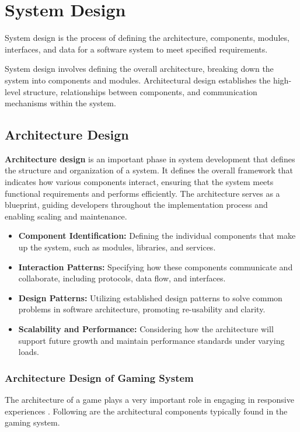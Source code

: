 \chapter{System Design}

System design is the process of defining the \cite {hocking2022unity} architecture, components, modules, interfaces, and data for a software system to meet specified requirements.

System design involves defining the overall architecture, breaking down the system into components and modules. Architectural design establishes the high-level structure, relationships between components, and communication mechanisms within the system.

\section{Architecture Design}
\textbf{Architecture design} is an important phase in system development that defines the structure and organization of a system. It defines the overall framework that indicates how various components interact, ensuring that the system meets functional requirements and performs efficiently. The architecture serves as a blueprint, guiding developers throughout the implementation process and enabling scaling and maintenance.

\begin{itemize}
\item \textbf{Component Identification:} Defining the individual components that make up the system, such as modules, libraries, and services.
\item  \textbf{Interaction Patterns:} Specifying how these components communicate and collaborate, including protocols, data flow, and interfaces.
\item \textbf{Design Patterns:} Utilizing established design patterns to solve common problems in software architecture, promoting re-usability and clarity.
\item \textbf{Scalability and Performance:} Considering how the architecture will support future growth and maintain performance standards under varying loads.
\end{itemize}
\subsection{Architecture Design of Gaming System}

The architecture of a game plays a very important role in engaging in responsive experiences \cite{kleppmann2017designing}. Following are the architectural components typically found in the gaming system.

